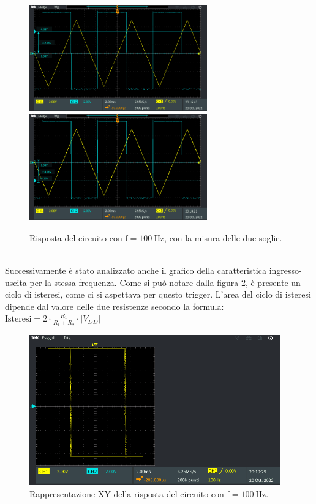 \documentclass{report}
\begin{document}
\begin{figure}[h!]
	\centering
	\includegraphics[height=4.6cm]{immagini/TEK00017}
	\includegraphics[height=4.6cm]{immagini/TEK00018}
	\caption{Risposta del circuito con $\mathrm{f= \SI{100}{\hertz}}$, con la misura delle due soglie.}
	\label{figura:uscita21}
\end{figure}
\\ Successivamente è stato analizzato anche il grafico della caratteristica ingresso-uscita per la stessa frequenza. Come si può notare dalla figura \ref{figura:uscita22}, è presente un ciclo di isteresi, come ci si aspettava per questo trigger. L'area del ciclo di isteresi dipende dal valore delle due resistenze secondo la formula:
\\[2pt]\indent$\displaystyle{\mathrm{Isteresi}=2\cdot\frac{R_1}{R_1+R_2}\cdot |V_ {DD}|}$
\begin{figure}[h!]
	\centering
	\includegraphics[height=6.5cm]{immagini/TEK00019}
	\caption{Rappresentazione XY della risposta del circuito con $\mathrm{f= \SI{100}{\hertz}}$.}
	\label{figura:uscita22}
\end{figure}
\end{document}
